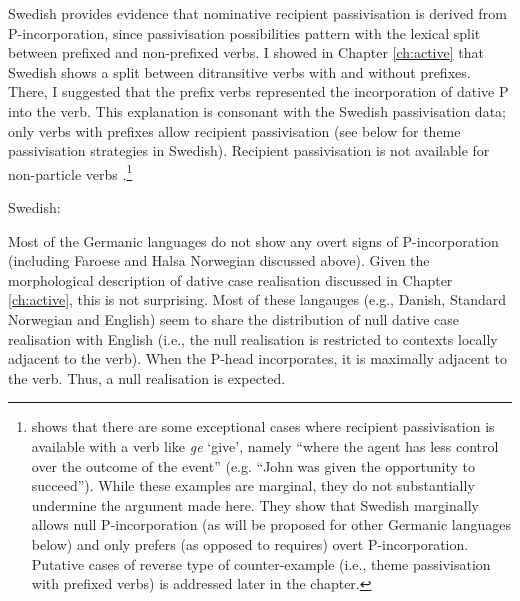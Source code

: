 Swedish provides evidence that nominative recipient passivisation is derived from P-incorporation, since passivisation possibilities pattern with the lexical split between prefixed and non-prefixed verbs. I showed in Chapter \ref{ch:active} that Swedish shows a split between ditransitive verbs with and without prefixes. There, I suggested that the prefix verbs represented the incorporation of dative P into the verb. This explanation is consonant with the Swedish passivisation data; only verbs with prefixes allow recipient passivisation (see below for theme passivisation strategies in Swedish). Recipient passivisation is not available for non-particle verbs \citep{Lundquist.2006}.\footnote{\cite{Lundquist.2004} shows that there are some exceptional cases where recipient passivisation is available with a verb like \textit{ge} `give', namely ``where the agent has less control over the outcome of the event'' (e.g. ``John was given the opportunity to succeed''). While these examples are marginal, they do not substantially undermine the argument made here. They show that Swedish marginally allows null P-incorporation (as will be proposed for other Germanic languages below) and only prefers (as opposed to requires) overt P-incorporation. Putative cases of reverse type of counter-example (i.e., theme passivisation with prefixed verbs) is addressed later in the chapter.} 

\begin{exe}
	\ex Swedish:\label{ex:swe-part}
	\begin{xlist}
\end{xlist}	
\end{exe}


Most of the Germanic languages do not show any overt signs of P-incorporation (including Faroese and Halsa Norwegian discussed above). Given the morphological description of dative case realisation discussed in Chapter \ref{ch:active}, this is not surprising. Most of these langauges (e.g., Danish, Standard Norwegian and English) seem to share the distribution of null dative case realisation with English (i.e., the null realisation is restricted to contexts locally adjacent to the verb). When the P-head incorporates, it is maximally adjacent to the verb. Thus, a null realisation is expected.


